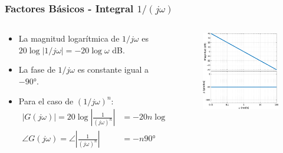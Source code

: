 \documentclass[aspectratio=169]{beamer}
\theoremstyle{definition}
\theoremstyle{plain}
\theoremstyle{remark}
\begin{document}
\begin{frame}[<+->]\frametitle{Factores Básicos - Integral $1/(j\omega)$}
\begin{columns}
	\begin{column}{0.5\textwidth}
	\begin{itemize}
		\item La magnitud logarítmica de $1/j\omega$ es $20\log\left| 1/j\omega \right| = -20 \log \omega$ dB.
		\item La fase de $1/j\omega$ es constante igual a $-\ang{90}$.
		\item Para el caso de $(1/j\omega)^n$:
		\begin{align*}
		  \left| G(j\omega) \right| = 20 \log \left| \frac{1}{(j\omega)^n} \right| &= -20n\log\omega \text{ dB}\\
			\angle G(j\omega) = \angle \left| \frac{1}{(j\omega)^n} \right| &= -n\ang{90}
		\end{align*}
	\end{itemize}
	\end{column}
	\begin{column}{0.5\textwidth}
		\begin{figure}
			\includegraphics[width=6.5cm]{images/bodeIntegral.eps}
		\end{figure}
	\end{column}
\end{columns}
\end{frame}
\end{document}
